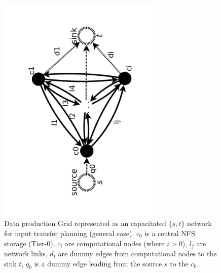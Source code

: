 \documentclass[english]{ddny}
\begin{document}
\begin{figure}[h]
	\begin{center}
		\includegraphics [trim= 30mm 20mm 30mm 30mm , clip, angle =-90, width=0.7\textwidth]{pic/network_general.pdf}
	\end{center}
	\caption{Data production Grid represented as an capacitated $\{s,t\}$ network for input transfer planning (general case). $c_{0}$ is a central NFS storage (Tier-0), $c_{i}$ are computational nodes (where $i>0$), $l_{j}$ are network links, $d_{i}$ are dummy edges from computational nodes to the sink $t$, $q_{0}$ is a dummy edge leading from the source $s$ to the $c_{0}$. }
	\label{network_general}
\end{figure} 
\end{document}
